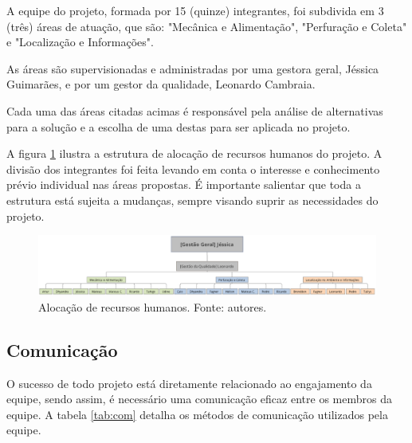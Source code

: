       A equipe do projeto, formada por 15 (quinze) integrantes, foi
      subdivida em 3 (três) áreas de atuação, que são: "Mecânica e Alimentação", "Perfuração e Coleta" e "Localização e Informações".

      As áreas são supervisionadas e administradas por uma gestora geral, Jéssica Guimarães,
      e por um gestor da qualidade, Leonardo Cambraia.

      Cada uma das áreas citadas acimas é responsável pela análise de alternativas
      para a solução e a escolha de uma destas para ser aplicada no projeto.

      A figura \ref{fig:aloc} ilustra a estrutura de alocação de recursos humanos do
      projeto. A divisão dos integrantes foi feita levando em conta o
      interesse e conhecimento prévio individual nas áreas propostas.
      É importante salientar que toda a estrutura está sujeita a mudanças, sempre
      visando suprir as necessidades do projeto.

      \begin{figure}[!htbp]
        \centering
        \includegraphics[width=\textwidth]{figuras/alocacao.eps}
        \caption{Alocação de recursos humanos. Fonte: autores.}
        \label{fig:aloc}
      \end{figure}

    \subsection{Comunicação}

      O sucesso de todo projeto está diretamente relacionado ao engajamento
      da equipe, sendo assim, é necessário uma comunicação eficaz entre os
      membros da equipe. A tabela \ref{tab:com} detalha os métodos de comunicação
      utilizados pela equipe.

